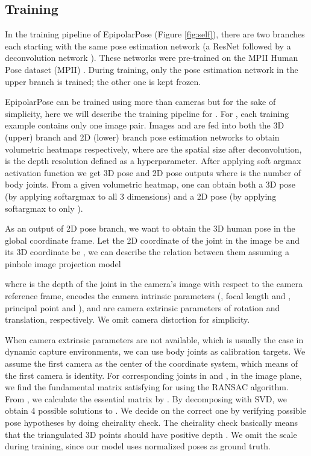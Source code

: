 \documentclass[10pt,twocolumn,letterpaper]{article}
\begin{document}
\subsection{Training} 
In the training pipeline of EpipolarPose (Figure \ref{fig:self}), there are two branches each starting with the same pose estimation network (a ResNet followed by a deconvolution network \cite{Sun_2018_ECCV}). These networks were pre-trained on the MPII Human Pose dataset (MPII) \cite{mpii}. During training, only the pose estimation network in the upper branch is trained; the other one is kept frozen. 

EpipolarPose can be trained using more than  cameras but for the sake of simplicity, here we will describe the training pipeline for .  For , each training example contains only one image pair. Images  and  are fed into both the 3D (upper) branch and 2D (lower) branch pose estimation networks to obtain volumetric heatmaps  respectively, where  are the spatial size after deconvolution,  is the depth resolution defined as a hyperparameter. After applying soft argmax activation function  we get 3D pose  and 2D pose  outputs where  is the number of body joints. From a given  volumetric heatmap, one can obtain both a 3D pose (by applying softargmax to all 3 dimensions) and a 2D pose (by applying softargmax to only ). 

As an output of 2D pose branch, we want to obtain the 3D human pose  in the global coordinate frame. Let the 2D coordinate of the   joint in the  image be  and its 3D coordinate be , we can describe the relation between them assuming  a pinhole image projection model

where  is the depth of the   joint in the  camera’s image with respect to the camera reference frame,  encodes the camera intrinsic parameters (\eg, focal length  and , principal point  and ),  and  are camera extrinsic parameters of rotation and translation, respectively. We omit camera distortion for simplicity.

When camera extrinsic parameters are not available, which is usually the case in dynamic capture environments, we can use body joints as calibration targets. We assume the first camera as the center of the coordinate system, which means  of the first camera is identity. For corresponding joints in   and  , in the image plane, we find the fundamental matrix  satisfying  for  using the RANSAC algorithm. From , we calculate the essential matrix  by . By decomposing  with SVD, we obtain 4 possible solutions to . We decide on the correct one by verifying possible pose hypotheses by doing cheirality check. The cheirality check basically means that the triangulated 3D points should have positive depth \cite{Nister2004}. We omit the scale during training, since our model uses normalized poses as ground truth.
\end{document}

